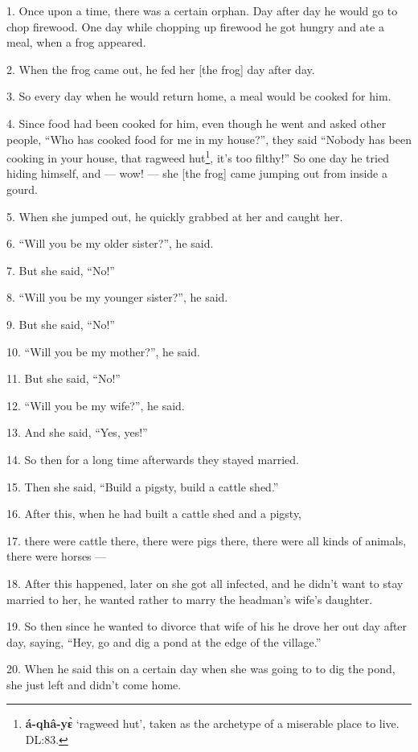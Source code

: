 \setcounter{footnote}{0}

1. Once upon a time, there was a certain orphan. Day after day he would go to chop
firewood. One day while chopping up firewood he got hungry and ate a meal, when
a frog appeared.

2. When the frog came out, he fed her [the frog] day after day.

3. So every day when he would return home, a meal would be cooked for him.

4. Since food had been cooked for him, even though he went and asked other people,
``Who has cooked food for me in my house?'', they said ``Nobody has been cooking
in your house, that ragweed hut\footnote{\textbf{á-qhâ-yɛ̀} `ragweed hut', taken as the archetype of a miserable place to live. DL:83.}, it's too filthy!'' So one day he tried hiding
himself, and --- wow! --- she [the frog] came jumping out from inside a gourd.

5. When she jumped out, he quickly grabbed at her and caught her.

6. ``Will you be my older sister?'', he said.

7. But she said, ``No!''

8. ``Will you be my younger sister?'', he said.

9. But she said, ``No!''

10. ``Will you be my mother?'', he said.

11. But she said, ``No!''

12. ``Will you be my wife?'', he said.

13. And she said, ``Yes, yes!''

14. So then for a long time afterwards they stayed married.

15. Then she said, ``Build a pigsty, build a cattle shed.''

16. After this, when he had built a cattle shed and a pigsty,

17. there were cattle there, there were pigs there, there were all kinds of animals,
there were horses ---

18. After this happened, later on she got all infected, and he didn't want to stay
married to her, he wanted rather to marry the headman's wife's daughter.

19. So then since he wanted to divorce that wife of his he drove her out day after
day, saying, ``Hey, go and dig a pond at the edge of the village.''

20. When he said this on a certain day when she was going to to dig the pond, she
just left and didn't come home.


